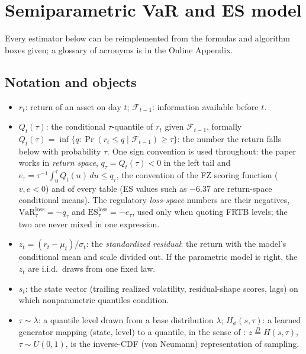 \documentclass[11pt]{article}
\newcommand{\VaR}{\mathrm{VaR}}
\newcommand{\ES}{\mathrm{ES}}
\theoremstyle{remark}
\begin{document}
\section{Semiparametric VaR and ES model}\label{sec:methods}

Every estimator below can be reimplemented from the formulas and
algorithm boxes given; a glossary of acronyms is in the Online
Appendix.

\subsection{Notation and objects}\label{sec:notation}

\begin{itemize}[leftmargin=1.5em,itemsep=0pt]
\item $r_t$: return of an asset on day $t$; $\mathcal{F}_{t-1}$: information available before $t$.
\item $Q_t(\tau)$: the conditional $\tau$-quantile of $r_t$ given
$\mathcal{F}_{t-1}$, formally
$Q_t(\tau) = \inf\{q : \Pr(r_t \le q \mid \mathcal{F}_{t-1}) \ge \tau\}$:
the number the return falls below with probability $\tau$. One sign
convention is used throughout: the paper works in \emph{return space},
$q_\tau = Q_t(\tau) < 0$ in the left tail and
$e_\tau = \tau^{-1}\int_0^{\tau} Q_t(u)\,du \le q_\tau$, the
convention of the FZ scoring function ($v,e<0$) and of every table
(ES values such as $-6.37$ are return-space conditional means). The
regulatory \emph{loss-space} numbers are their negatives,
$\VaR^{\mathrm{loss}}_\tau=-q_\tau$ and
$\ES^{\mathrm{loss}}_\tau=-e_\tau$, used only when quoting FRTB
levels; the two are never mixed in one expression.
\item $z_t = (r_t-\mu_t)/\sigma_t$: the \emph{standardized residual}:
the return with the model's conditional mean and scale divided out. If
the parametric model is right, the $z_t$ are i.i.d.\ draws from one
fixed law.
\item $s_t$: the state vector (trailing realized volatility,
residual-shape scores, lags) on which nonparametric quantiles condition.
\item $\tau \sim \lambda$: a quantile level drawn from a base
distribution $\lambda$; $H_\phi(s,\tau)$: a learned generator mapping
(state, level) to a quantile, in the sense of
\citet{polson2023gbc}: $z \overset{D}{=} H(s,\tau)$, $\tau\sim U(0,1)$,
is the inverse-CDF (von Neumann) representation of sampling.
\end{itemize}
\end{document}
